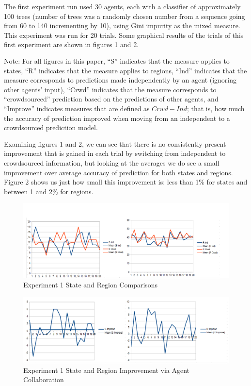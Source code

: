 \documentclass{article}
\begin{document}
\par The first experiment run used 30 agents, each with a classifier of approximately 100 trees (number of trees was a randomly chosen number from a sequence going from 60 to 140 incrementing by 10), using Gini impurity as the mixed measure. This experiment was run for 20 trials. Some graphical results of the trials of this first experiment are shown in figures 1 and 2. 
\par Note: For all figures in this paper, ``S'' indicates that the measure applies to states, ``R'' indicates that the measure applies to regions, ``Ind'' indicates that the measure corresponds to predictions made independently by an agent (ignoring other agents' input), ``Crwd'' indicates that the measure corresponds to ``crowdsourced'' prediction based on the predictions of other agents, and ``Improve'' indicates measures that are defined as $Crwd-Ind$; that is, how much the accuracy of prediction improved when moving from an independent to a crowdsourced prediction model.
\par Examining figures 1 and 2, we can see that there is no consistently present improvement that is gained in each trial by switching from independent to crowdsourced information, but looking at the averages we do see a small improvement over average accuracy of prediction for both states and regions. Figure 2 shows us just how small this improvement is: less than 1\% for states and between 1 and 2\% for regions. 

\begin{figure}[H]
		\includegraphics[width=\textwidth]{e1_comparative}
		\caption{Experiment 1 State and Region Comparisons}
\end{figure}

\begin{figure}[H]
	\includegraphics[width=\textwidth]{e1_improvement}
	\caption{Experiment 1 State and Region Improvement via Agent Collaboration}
\end{figure}
\end{document}
